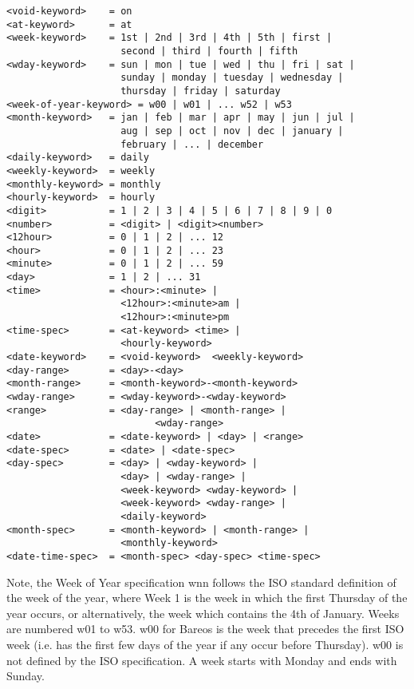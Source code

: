 \begin{description}
\footnotesize
\begin{verbatim}
<void-keyword>    = on
<at-keyword>      = at
<week-keyword>    = 1st | 2nd | 3rd | 4th | 5th | first |
                    second | third | fourth | fifth
<wday-keyword>    = sun | mon | tue | wed | thu | fri | sat |
                    sunday | monday | tuesday | wednesday |
                    thursday | friday | saturday
<week-of-year-keyword> = w00 | w01 | ... w52 | w53
<month-keyword>   = jan | feb | mar | apr | may | jun | jul |
                    aug | sep | oct | nov | dec | january |
                    february | ... | december
<daily-keyword>   = daily
<weekly-keyword>  = weekly
<monthly-keyword> = monthly
<hourly-keyword>  = hourly
<digit>           = 1 | 2 | 3 | 4 | 5 | 6 | 7 | 8 | 9 | 0
<number>          = <digit> | <digit><number>
<12hour>          = 0 | 1 | 2 | ... 12
<hour>            = 0 | 1 | 2 | ... 23
<minute>          = 0 | 1 | 2 | ... 59
<day>             = 1 | 2 | ... 31
<time>            = <hour>:<minute> |
                    <12hour>:<minute>am |
                    <12hour>:<minute>pm
<time-spec>       = <at-keyword> <time> |
                    <hourly-keyword>
<date-keyword>    = <void-keyword>  <weekly-keyword>
<day-range>       = <day>-<day>
<month-range>     = <month-keyword>-<month-keyword>
<wday-range>      = <wday-keyword>-<wday-keyword>
<range>           = <day-range> | <month-range> |
                          <wday-range>
<date>            = <date-keyword> | <day> | <range>
<date-spec>       = <date> | <date-spec>
<day-spec>        = <day> | <wday-keyword> |
                    <day> | <wday-range> |
                    <week-keyword> <wday-keyword> |
                    <week-keyword> <wday-range> |
                    <daily-keyword>
<month-spec>      = <month-keyword> | <month-range> |
                    <monthly-keyword>
<date-time-spec>  = <month-spec> <day-spec> <time-spec>
\end{verbatim}
\normalsize

\end{description}

Note, the Week of Year specification wnn follows the ISO standard definition
of the week of the year, where Week 1 is the week in which the first Thursday
of the year occurs, or alternatively, the week which contains the 4th of
January. Weeks are numbered w01 to w53. w00 for Bareos is the week that
precedes the first ISO week (i.e. has the first few days of the year if any
occur before Thursday). w00 is not defined by the ISO specification. A week
starts with Monday and ends with Sunday.

